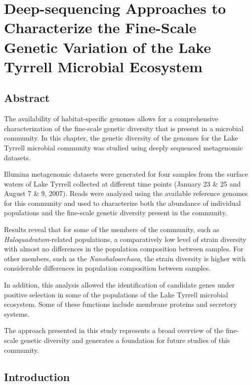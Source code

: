 \chapter{Deep-sequencing Approaches to Characterize the Fine-Scale Genetic Variation of the Lake Tyrrell Microbial Ecosystem}

\section{Abstract}

The availability of habitat-specific genomes allows for a comprehensive characterization of the fine-scale genetic diversity that is present in a microbial community. In this chapter, the genetic diversity of the genomes for the Lake Tyrrell microbial community was studied using deeply sequenced metagenomic datasets.

Illumina metagenomic datasets were generated for four samples from the surface waters of Lake Tyrrell collected at different time points (January 23 \& 25 and August 7 \& 9, 2007). Reads were analyzed using the available reference genomes for this community and used to characterize both the abundance of individual populations and the fine-scale genetic diversity present in the community.

Results reveal that for some of the members of the community, such as \textit{Haloquadratum}-related populations, a comparatively low level of strain diversity with almost no differences in the population composition between samples. For other members, such as the \textit{Nanohaloarchaea}, the strain diversity is higher with considerable differences in population composition between samples.

In addition, this analysis allowed the identification of candidate genes under positive selection in some of the populations of the Lake Tyrrell microbial ecosystem. Some of these functions include membrane proteins and secretory systems.

The approach presented in this study represents a broad overview of the fine-scale genetic diversity and generates a foundation for future studies of this community.


\section{Introduction}

